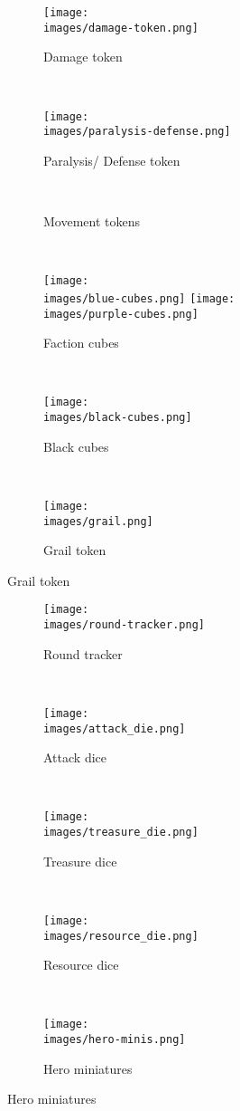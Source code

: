 \begin{figure}[H]
  \centering
  \begin{subfigure}[b]{0.08\linewidth}
    \centering
    \texttt{[image: \\images/damage-token.png]}
    \caption{\centering Damage token}
  \end{subfigure}
  ~
  \begin{subfigure}[b]{0.15\linewidth}
    \centering
    \texttt{[image: \\images/paralysis-defense.png]}
    \caption{\centering Paralysis/ Defense token}
  \end{subfigure}
  ~
  \begin{subfigure}[b]{0.15\linewidth}
    
    \caption{\centering Movement tokens}
  \end{subfigure}
  ~
  \begin{subfigure}[b]{0.15\linewidth}
    \centering
    \texttt{[image: \\images/blue-cubes.png]}
    \texttt{[image: \\images/purple-cubes.png]}
    \caption{\centering Faction cubes}
  \end{subfigure}
  ~
  \begin{subfigure}[b]{0.15\linewidth}
    \texttt{[image: \\images/black-cubes.png]}
    \caption{\centering Black cubes}
  \end{subfigure}
  ~
  \begin{subfigure}[b]{0.15\linewidth}
    \texttt{[image: \\images/grail.png]}
    \caption{\centering Grail token}
  \end{subfigure}
\end{figure}
\vspace*{-2em}
\begin{figure}[H]
  \centering
  \begin{subfigure}[b]{0.3\linewidth}
    \texttt{[image: \\images/round-tracker.png]}
    \caption{\centering Round tracker}
  \end{subfigure}
  ~
  \begin{subfigure}[b]{0.07\linewidth}
    \texttt{[image: \\images/attack\_die.png]}
    \caption{\centering Attack dice}
  \end{subfigure}
  ~
  \begin{subfigure}[b]{0.1\linewidth}
    \texttt{[image: \\images/treasure\_die.png]}
    \caption{\centering Treasure dice}
  \end{subfigure}
  ~
  \begin{subfigure}[b]{0.1\linewidth}
    \texttt{[image: \\images/resource\_die.png]}
    \caption{\centering Resource dice}
  \end{subfigure}
  ~
  \begin{subfigure}[b]{0.3\linewidth}
    \texttt{[image: \\images/hero-minis.png]}
    \vspace*{-2em}
    \caption{\centering Hero miniatures}
  \end{subfigure}
\end{figure}

